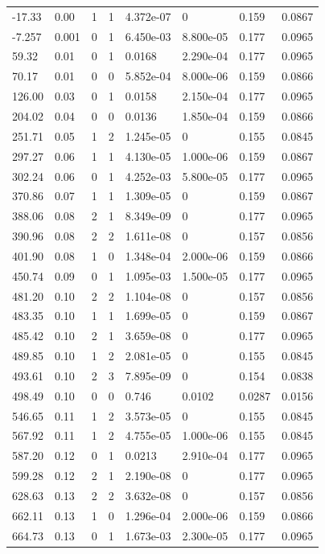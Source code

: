 \documentclass[preview]{standalone}
\begin{document}
{{\begin{tabular}{L{1.2cm}C{1.2cm} C{0.3cm}C{0.5cm} C{1.4cm}C{1.4cm} C{1.4cm}C{1.4cm}}
  -17.33  &  0.00  & 1     &  1 &  4.372e-07  & 0  & 0.159 &  0.0867   \\ 
  -7.257  &  0.001  & 0     &  1 &  6.450e-03  & 8.800e-05  & 0.177 &  0.0965   \\ 
  59.32  &  0.01  & 0     &  1 &  0.0168  & 2.290e-04  & 0.177 &  0.0965   \\ 
  70.17  &  0.01  & 0     &  0 &  5.852e-04  & 8.000e-06  & 0.159 &  0.0866   \\ 
  126.00  &  0.03  & 0     &  1 &  0.0158  & 2.150e-04  & 0.177 &  0.0965   \\ 
  204.02  &  0.04  & 0     &  0 &  0.0136  & 1.850e-04  & 0.159 &  0.0866   \\ 
  251.71  &  0.05  & 1     &  2 &  1.245e-05  & 0  & 0.155 &  0.0845   \\ 
  297.27  &  0.06  & 1     &  1 &  4.130e-05  & 1.000e-06  & 0.159 &  0.0867   \\ 
  302.24  &  0.06  & 0     &  1 &  4.252e-03  & 5.800e-05  & 0.177 &  0.0965   \\ 
  370.86  &  0.07  & 1     &  1 &  1.309e-05  & 0  & 0.159 &  0.0867   \\ 
  388.06  &  0.08  & 2     &  1 &  8.349e-09  & 0  & 0.177 &  0.0965   \\ 
  390.96  &  0.08  & 2     &  2 &  1.611e-08  & 0  & 0.157 &  0.0856   \\ 
  401.90  &  0.08  & 1     &  0 &  1.348e-04  & 2.000e-06  & 0.159 &  0.0866   \\ 
  450.74  &  0.09  & 0     &  1 &  1.095e-03  & 1.500e-05  & 0.177 &  0.0965   \\ 
  481.20  &  0.10  & 2     &  2 &  1.104e-08  & 0  & 0.157 &  0.0856   \\ 
  483.35  &  0.10  & 1     &  1 &  1.699e-05  & 0  & 0.159 &  0.0867   \\ 
  485.42  &  0.10  & 2     &  1 &  3.659e-08  & 0  & 0.177 &  0.0965   \\ 
  489.85  &  0.10  & 1     &  2 &  2.081e-05  & 0  & 0.155 &  0.0845   \\ 
  493.61  &  0.10  & 2     &  3 &  7.895e-09  & 0  & 0.154 &  0.0838   \\ 
  498.49  &  0.10  & 0     &  0 &  0.746  & 0.0102  & 0.0287 &  0.0156   \\ 
  546.65  &  0.11  & 1     &  2 &  3.573e-05  & 0  & 0.155 &  0.0845   \\ 
  567.92  &  0.11  & 1     &  2 &  4.755e-05  & 1.000e-06  & 0.155 &  0.0845   \\ 
  587.20  &  0.12  & 0     &  1 &  0.0213  & 2.910e-04  & 0.177 &  0.0965   \\ 
  599.28  &  0.12  & 2     &  1 &  2.190e-08  & 0  & 0.177 &  0.0965   \\ 
  628.63  &  0.13  & 2     &  2 &  3.632e-08  & 0  & 0.157 &  0.0856   \\ 
  662.11  &  0.13  & 1     &  0 &  1.296e-04  & 2.000e-06  & 0.159 &  0.0866   \\ 
  664.73  &  0.13  & 0     &  1 &  1.673e-03  & 2.300e-05  & 0.177 &  0.0965   \\ 
\hline 
\end{tabular} 

}}
\end{document}
